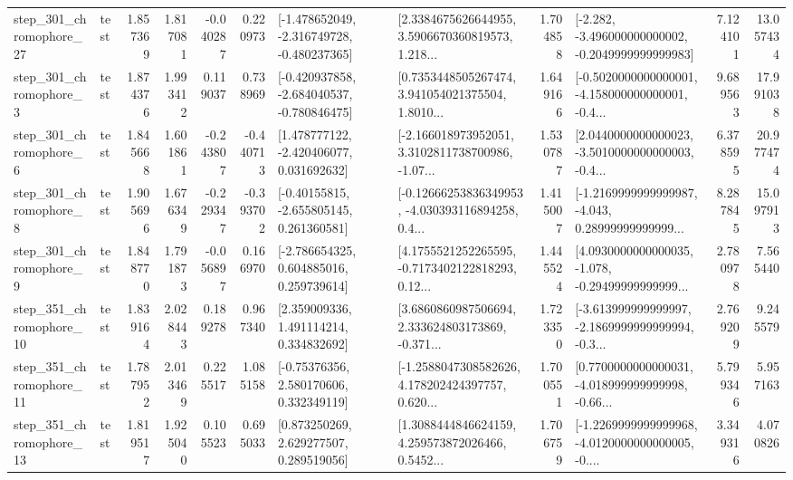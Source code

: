 \begin{tabular}{llrrrrllrlrr}
  step\_301\_chromophore\_27 &      test &      1.857369 &    1.817081 &     -0.040287 &  0.220973 &  [-1.478652049, -2.316749728, -0.480237365] &  [2.3384675626644955, 3.5906670360819573, 1.218... &       1.704858 &  [-2.282, -3.496000000000002, -0.2049999999999983] &            7.124101 &         13.057434 \\
   step\_301\_chromophore\_3 &      test &      1.874376 &    1.993412 &      0.119037 &  0.738969 &  [-0.420937858, -2.684040537, -0.780846475] &  [0.7353448505267474, 3.941054021375504, 1.8010... &       1.649166 &  [-0.5020000000000001, -4.158000000000001, -0.4... &            9.689563 &         17.991038 \\
   step\_301\_chromophore\_6 &      test &      1.845668 &    1.601861 &     -0.243807 & -0.440713 &    [1.478777122, -2.420406077, 0.031692632] &  [-2.166018973952051, 3.3102811738700986, -1.07... &       1.530787 &  [2.0440000000000023, -3.5010000000000003, -0.4... &            6.378595 &         20.977474 \\
   step\_301\_chromophore\_8 &      test &      1.905696 &    1.676349 &     -0.229347 & -0.393702 &    [-0.40155815, -2.655805145, 0.261360581] &  [-0.12666253836349953, -4.030393116894258, 0.4... &       1.415007 &  [-1.2169999999999987, -4.043, 0.28999999999999... &            8.287845 &         15.097913 \\
   step\_301\_chromophore\_9 &      test &      1.848770 &    1.791873 &     -0.056897 &  0.166970 &    [-2.786654325, 0.604885016, 0.259739614] &  [4.1755521252265595, -0.7173402122818293, 0.12... &       1.445524 &  [4.0930000000000035, -1.078, -0.29499999999999... &            2.780978 &          7.565440 \\
  step\_351\_chromophore\_10 &      test &      1.839164 &    2.028443 &      0.189278 &  0.967340 &     [2.359009336, 1.491114214, 0.334832692] &  [3.6860860987506694, 2.333624803173869, -0.371... &       1.723350 &  [-3.613999999999997, -2.1869999999999994, -0.3... &            2.769209 &          9.245579 \\
  step\_351\_chromophore\_11 &      test &      1.787952 &    2.013469 &      0.225517 &  1.085158 &     [-0.75376356, 2.580170606, 0.332349119] &  [-1.2588047308582626, 4.178202424397757, 0.620... &       1.700551 &  [0.7700000000000031, -4.018999999999998, -0.66... &            5.799346 &          5.957163 \\
  step\_351\_chromophore\_13 &      test &      1.819517 &    1.925040 &      0.105523 &  0.695033 &     [0.873250269, 2.629277507, 0.289519056] &  [1.3088444846624159, 4.259573872026466, 0.5452... &       1.706759 &  [-1.2269999999999968, -4.0120000000000005, -0.... &            3.349316 &          4.070826 \\

\end{tabular}

